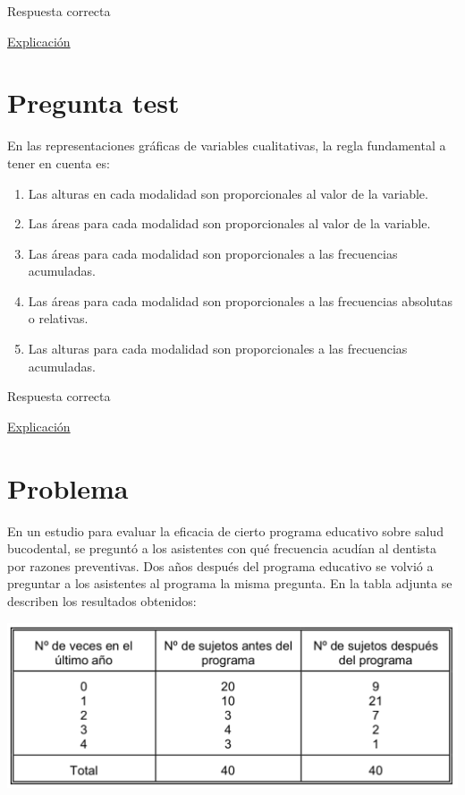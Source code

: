 \documentclass[
]{book}
\providecommand{\tightlist}{%
  \setlength{\itemsep}{0pt}\setlength{\parskip}{0pt}}
\begin{document}
Respuesta correcta

\href{https://1fjmanzano.github.io/bioestadistica/otros-gra\%CC\%81ficos.html}{Explicación}

\hypertarget{pregunta-test-27}{%
\section{Pregunta test}\label{pregunta-test-27}}

En las representaciones gráficas de variables cualitativas, la regla fundamental a tener en cuenta es:

\begin{enumerate}
\def\labelenumi{\alph{enumi})}
\tightlist
\item
  Las alturas en cada modalidad son proporcionales al valor de la variable.
\item
  Las áreas para cada modalidad son proporcionales al valor de la variable.
\item
  Las áreas para cada modalidad son proporcionales a las frecuencias acumuladas.
\item
  Las áreas para cada modalidad son proporcionales a las frecuencias absolutas o relativas.
\item
  Las alturas para cada modalidad son proporcionales a las frecuencias acumuladas.
\end{enumerate}

Respuesta correcta

\href{https://1fjmanzano.github.io/bioestadistica/diagramas-de-barras-y-sectores.html}{Explicación}

\hypertarget{problema-6}{%
\section{Problema}\label{problema-6}}

En un estudio para evaluar la eficacia de cierto programa educativo sobre salud bucodental, se preguntó a los asistentes con qué frecuencia acudían al dentista por razones preventivas. Dos años después del programa educativo se volvió a preguntar a los asistentes al programa la misma pregunta. En la tabla adjunta se describen los resultados obtenidos:

\includegraphics[width=16.06in]{img/2_2}
\end{document}
